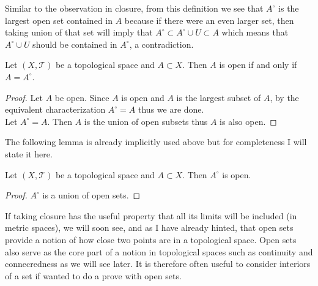 \documentclass[a4paper]{article}
\begin{document}
Similar to the observation in closure, from this definition we see that $A^\circ$ is the largest open set contained in $A$ because if there were an even larger set, then taking union of that set will imply that $A^\circ\subset A^\circ\cup U\subset A$ which means that $A^\circ\cup U$ should be contained in $A^\circ$, a contradiction. 

\begin{prp}{}{} Let $(X,\mathcal{T})$ be a topological space and $A\subset X$. Then $A$ is open if and only if $A=A^\circ$. 
\begin{proof}
Let $A$ be open. Since $A$ is open and $A$ is the largest subset of $A$, by the equivalent characterization $A^\circ=A$ thus we are done. \\
Let $A^\circ=A$. Then $A$ is the union of open subsets thus $A$ is also open. 
\end{proof}
\end{prp}

The following lemma is already implicitly used above but for completeness I will state it here. 

\begin{lmm}{}{} Let $(X,\mathcal{T})$ be a topological space and $A\subset X$. Then $A^\circ$ is open. 
\begin{proof}
$A^\circ$ is a union of open sets. 
\end{proof}
\end{lmm}

If taking closure has the useful property that all its limits will be included (in metric spaces), we will soon see, and as I have already hinted, that open sets provide a notion of how close two points are in a topological space. Open sets also serve as the core part of a notion in topological spaces such as continuity and connecredness as we will see later. It is therefore often useful to consider interiors of a set if wanted to do a prove with open sets. 
\end{document}
